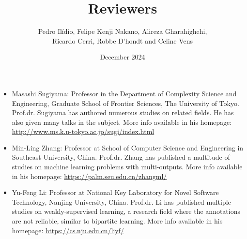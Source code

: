 \documentclass{article}
\title{Reviewers}
\author{Pedro Ilídio, Felipe Kenji Nakano, Alireza Gharahighehi,
\\ Ricardo Cerri, Robbe D'hondt and Celine Vens}
\date{December 2024}
\begin{document}
%
\maketitle

\begin{itemize}
\item Masashi Sugiyama: Professor in the Department of Complexity Science and Engineering, Graduate School of Frontier Sciences, The University of Tokyo. Prof.dr. Sugiyama has authored numerous studies on related fields. He has also given many talks in the subject. More info available in his homepage: \url{http://www.ms.k.u-tokyo.ac.jp/sugi/index.html}    

\item Min-Ling Zhang:  Professor at School of Computer Science and Engineering in Southeast University, China. Prof.dr. Zhang has published a multitude of studies on machine learning problems with multi-outputs. More info available in his homepage: \url{https://palm.seu.edu.cn/zhangml/}     

\item Yu-Feng Li: Professor at National Key Laboratory for Novel Software Technology, Nanjing University, China. Prof.dr. Li has published multiple studies on weakly-supervised learning, a research field where the annotations are not reliable, similar to bipartite learning. More info available in his homepage: \url{https://cs.nju.edu.cn/liyf/}     


\end{itemize}
\end{document}
